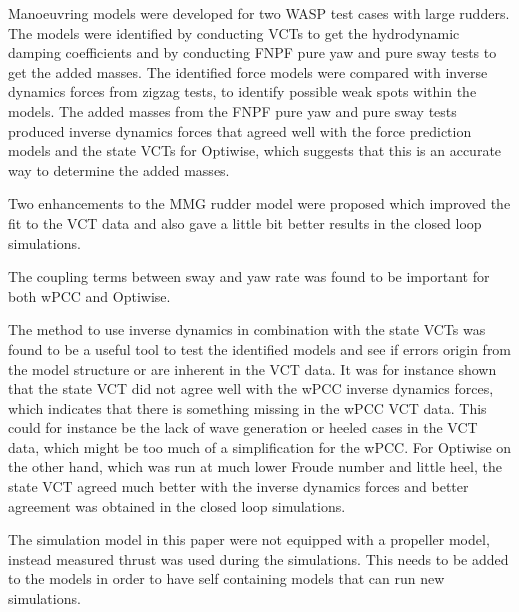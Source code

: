 %
Manoeuvring models were developed for two WASP test cases with large rudders. The models were identified by conducting VCTs to get the hydrodynamic damping coefficients and by conducting FNPF pure yaw and pure sway tests to get the added masses. The identified force models were compared with inverse dynamics forces from zigzag tests, to identify possible weak spots within the models.  
The added masses from the FNPF pure yaw and pure sway tests produced inverse dynamics forces that agreed well with the force prediction models and the state VCTs for Optiwise, which suggests that this is an accurate way to determine the added masses.

Two enhancements to the MMG rudder model were proposed which improved the fit to the VCT data and also gave a little bit better results in the closed loop simulations.

The coupling terms between sway and yaw rate was found to be important for both wPCC and Optiwise.

The method to use inverse dynamics in combination with the state VCTs was found to be a useful tool to test the identified models and see if errors origin from the model structure or are inherent in the VCT data.
It was for instance shown that the state VCT did not agree well with the wPCC inverse dynamics forces, which indicates that there is something missing in the wPCC VCT data. This could for instance be the lack of wave generation or heeled cases in the VCT data, which might be too much of a simplification for the wPCC.
For Optiwise on the other hand, which was run at much lower Froude number and little heel, the state VCT agreed much better with the inverse dynamics forces and better agreement was obtained in the closed loop simulations.

The simulation model in this paper were not equipped with a propeller model, instead measured thrust was used during the simulations. This needs to be added to the models in order to have self containing models that can run new simulations. 
